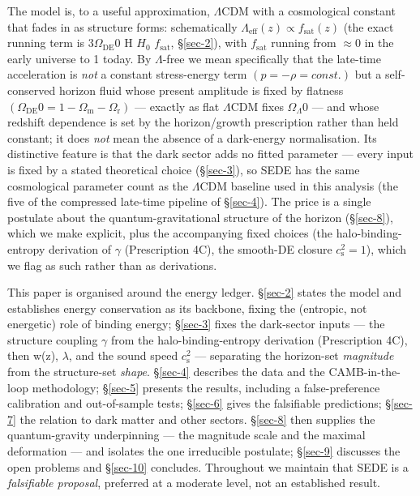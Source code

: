 \documentclass[preprint,12pt]{elsarticle}
\begin{document}
The model is, to a useful approximation, \(\Lambda \mathrm{CDM}\) with a
cosmological constant that fades in as structure forms: schematically
\(\Lambda _{\mathrm{eff}}(z) \propto  f_{\mathrm{sat}}(z)\) (the exact
running term is \(3\Omega _\mathrm{DE}0\) H \(H_{0}\)
\(f_{\mathrm{sat}}\), §\ref{sec-2}), with \(f_{\mathrm{sat}}\) running
from \(\approx 0\) in the early universe to 1 today. By \(\Lambda\)-free
we mean specifically that the late-time acceleration is \emph{not} a
constant stress-energy term \((p = -\rho  = const.)\) but a
self-conserved horizon fluid whose present amplitude is fixed by
flatness
\((\Omega _\mathrm{DE}0 = 1 - \Omega _{\mathrm{m}} - \Omega _{\mathrm{r}})\)
--- exactly as flat \(\Lambda \mathrm{CDM}\) fixes \(\Omega _\Lambda 0\)
--- and whose redshift dependence is set by the horizon/growth
prescription rather than held constant; it does \emph{not} mean the
absence of a dark-energy normalisation. Its distinctive feature is that
the dark sector adds no fitted parameter --- every input is fixed by a
stated theoretical choice (§\ref{sec-3}), so SEDE has the same
cosmological parameter count as the \(\Lambda \mathrm{CDM}\) baseline
used in this analysis (the five of the compressed late-time pipeline of
§\ref{sec-4}). The price is a single postulate about the
quantum-gravitational structure of the horizon (§\ref{sec-8}), which we
make explicit, plus the accompanying fixed choices (the
halo-binding-entropy derivation of \(\gamma\) (Prescription 4C), the
smooth-DE closure \(c_{\mathrm{s}}^{2}=1\)), which we flag as such
rather than as derivations.

This paper is organised around the energy ledger. §\ref{sec-2} states
the model and establishes energy conservation as its backbone, fixing
the (entropic, not energetic) role of binding energy; §\ref{sec-3} fixes
the dark-sector inputs --- the structure coupling \(\gamma\) from the
halo-binding-entropy derivation (Prescription 4C), then w(z),
\(\lambda\), and the sound speed \(c_{\mathrm{s}}^{2}\) --- separating
the horizon-set \emph{magnitude} from the structure-set \emph{shape}.
§\ref{sec-4} describes the data and the CAMB-in-the-loop methodology;
§\ref{sec-5} presents the results, including a false-preference
calibration and out-of-sample tests; §\ref{sec-6} gives the falsifiable
predictions; §\ref{sec-7} the relation to dark matter and other sectors.
§\ref{sec-8} then supplies the quantum-gravity underpinning --- the
magnitude scale and the maximal deformation --- and isolates the one
irreducible postulate; §\ref{sec-9} discusses the open problems and
§\ref{sec-10} concludes. Throughout we maintain that SEDE is a
\emph{falsifiable proposal}, preferred at a moderate level, not an
established result.
\end{document}
